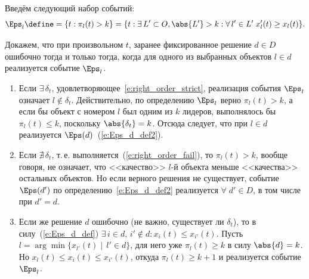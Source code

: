 
Введём следующий набор событий:
\begin{equation}
  \label{e:Eps_l_def}
  \Eps_l \define= \{t: \pi_l(t) > k\} = \{t: \exists\, L' \subset O, \abs{L'} > k: \forall\, l' \in L'\;x_l'(t) \geq x_{l}(t)\}.
\end{equation}

Докажем, что при произвольном $t$, заранее фиксированное решение $d \in D$ ошибочно тогда и только тогда, когда для одного из выбранных объектов $l \in d$ реализуется событие $\Eps_l$.
\begin{enumerate}
  \item Если $\exists\, \delta_t$, удовлетворяющее~\eqref{e:right_order_strict}, реализация события $\Eps_l$ означает $l \notin \delta_t$.
  Действительно, по определению $\Eps_l$ верно $\pi_l(t) > k$, а если бы объект с номером $l$ был одним из $k$ лидеров, выполнялось бы $\pi_l(t) \leq k$, поскольку $\abs{\delta_t} = k$. Отсюда следует, что при $l \in d$ реализуется $\Eps(d)$~(\ref{e:Eps_d_def2}).
  \item Если $\nexists\, \delta_t$, т.\,е. выполняется~(\ref{e:right_order_fail}), то $\pi_l(t) > k$, вообще говоря, не означает, что <<качество>> $l$-й объекта меньше <<качества>> остальных объектов. Но если верного решения не существует, событие $\Eps(d')$ по определению~\eqref{e:Eps_d_def2} реализуется $\forall\; d' \in D$, в том числе при $d' = d$. 
  \item Если же решение $d$ ошибочно (не важно, существует ли $\delta_t$), то в силу~(\ref{e:Eps_d_def}) $\exists\, i \in d,\, i' \notin d: x_i(t) \leq x_{i'}(t)$. %
  Пусть $l = \arg\min \{x_{l'}(t)\mid\,l' \in d\}$, для него уже $\pi_l(t) \geq k$ в силу $\abs{d} = k$. Но $x_l(t) \leq x_i(t) \leq x_{i'}(t)$, откуда $\pi_l(t) \geq k+1$ и реализуется событие $\Eps_l$.     
\end{enumerate}

